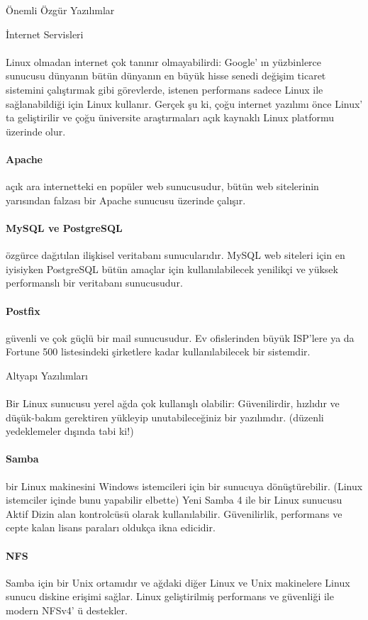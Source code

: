 \documentclass[10pt,a5paper]{book}
\begin{document}
\begin{section}{Önemli Özgür Yazılımlar}
\begin{subsection}{İnternet Servisleri}
\paragraph{}{Linux olmadan internet çok tanınır olmayabilirdi: Google' ın yüzbinlerce sunucusu dünyanın bütün dünyanın en büyük hisse senedi değişim ticaret sistemini çalıştırmak gibi görevlerde, istenen performans sadece Linux ile sağlanabildiği için Linux kullanır. Gerçek şu ki, çoğu internet yazılımı önce Linux' ta geliştirilir ve çoğu üniversite araştırmaları açık kaynaklı Linux platformu üzerinde olur.}
\paragraph{Apache}{açık ara internetteki en popüler web sunucusudur, bütün web sitelerinin yarısından falzası bir Apache sunucusu üzerinde çalışır.}
\paragraph{MySQL ve PostgreSQL}{özgürce dağıtılan ilişkisel veritabanı sunucularıdır. MySQL web siteleri için en iyisiyken PostgreSQL bütün amaçlar için kullanılabilecek yenilikçi ve yüksek performanslı bir veritabanı sunucusudur.}
\paragraph{Postfix}{güvenli ve çok güçlü bir mail sunucusudur. Ev ofislerinden büyük ISP'lere ya da Fortune 500 listesindeki şirketlere kadar kullanılabilecek bir sistemdir.}
\end{subsection}
\begin{subsection}{Altyapı Yazılımları}
\paragraph{}{Bir Linux sunucusu yerel ağda çok kullanışlı olabilir: Güvenilirdir, hızlıdır ve düşük-bakım gerektiren yükleyip unutabileceğiniz bir yazılımdır. (düzenli yedeklemeler dışında tabi ki!)}
\paragraph{Samba}{bir Linux makinesini Windows istemcileri için bir sunucuya dönüştürebilir. (Linux istemciler içinde bunu yapabilir elbette) Yeni Samba 4 ile bir Linux sunucusu Aktif Dizin alan kontrolcüsü olarak kullanılabilir. Güvenilirlik, performans ve cepte kalan lisans paraları oldukça ikna edicidir.}
\paragraph{NFS}{Samba için bir Unix ortamıdır ve ağdaki diğer Linux ve Unix makinelere Linux sunucu diskine erişimi sağlar. Linux geliştirilmiş performans ve güvenliği ile modern NFSv4' ü destekler.}

\end{subsection}
\end{section}
\end{document}
